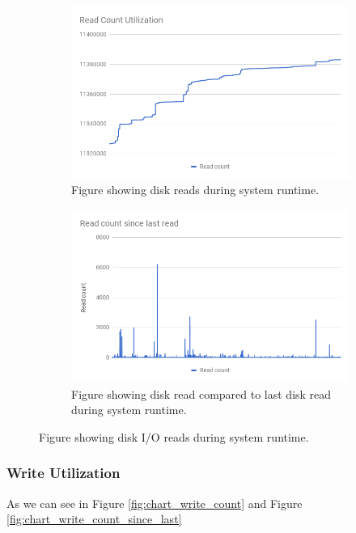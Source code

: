 \documentclass[USenglish]{uit-thesis}
\begin{document}
\begin{figure}
\centering
\begin{subfigure}[b]{1\textwidth}
   \includegraphics[width=1\textwidth]{chart_read_count.png}
   \caption{Figure showing disk reads during system runtime.}
   \label{fig:chart_read_count} 
\end{subfigure}

\begin{subfigure}[b]{1\textwidth}
   \includegraphics[width=1\textwidth]{chart_read_count_since_last.png}
   \caption{Figure showing disk read compared to last disk read during system runtime.}
   \label{fig:chart_read_count_since_last}
\end{subfigure}

\caption{Figure showing disk I/O reads during system runtime.}
\label{fig:read_disks}
\end{figure}


\subsubsection{Write Utilization}
As we can see in Figure \ref{fig:chart_write_count} and Figure \ref{fig:chart_write_count_since_last}
\end{document}

